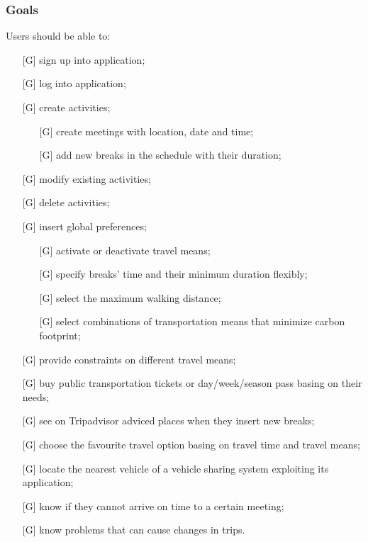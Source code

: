 \documentclass[12pt,titlepage]{article}
\begin{document}
\subsubsection{Goals}\label{RASD}
Users should be able to:
\begin{itemize}

\item [{[G\ped{1}]}]	sign up into application;
\item [{[G\ped{2}]}]	log into application;
\item [{[G\ped{3}]}]	create activities;
\begin{itemize}
\item [{[G\ped{3.1}]}]	create meetings with location, date and time;
\item [{[G\ped{3.2}]}]	add new breaks in the schedule with their duration;
\end{itemize}
\item [{[G\ped{4}]}]	modify existing activities;

\item [{[G\ped{5}]}]	delete activities;
\item [{[G\ped{6}]}]	insert global preferences;
\begin{itemize}
\item [{[G\ped{6.1}]}]	activate or deactivate travel means;
\item [{[G\ped{6.2}]}]	specify breaks' time and their minimum duration flexibly;
\item [{[G\ped{6.3}]}]	select the maximum walking distance;
\item [{[G\ped{6.4}]}]	select combinations of transportation means that minimize carbon footprint;
\end{itemize}

\item [{[G\ped{7}]}]	 provide constraints on different travel means;
\item [{[G\ped{8}]}]	buy public transportation tickets or day/week/season pass basing on their needs;

\item [{[G\ped{9}]}]	see on Tripadvisor adviced places when they insert new breaks;
\item [{[G\ped{10}]}]	choose the favourite travel option basing on travel time and travel means;
\item [{[G\ped{11}]}]	locate the nearest vehicle of a vehicle sharing system exploiting its application;
\item [{[G\ped{12}]}]	know if they cannot arrive on time to a certain meeting;
\item [{[G\ped{13}]}]	know problems that can cause changes in trips.

 \end{itemize}
\end{document}
